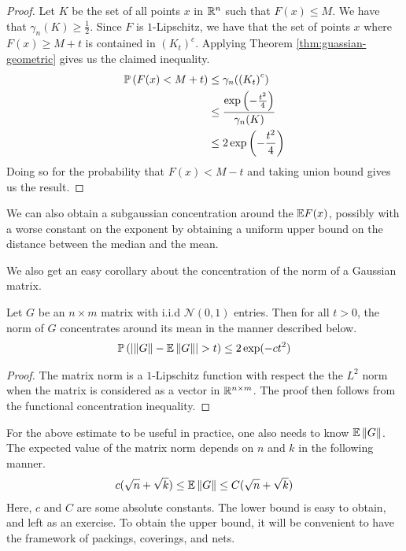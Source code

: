 \documentclass[11pt]{article}
\begin{document}
\begin{proof}
  Let $K$ be the set of all points $x$ in $\R^n$ such that $F(x) \leq M$.
  We have that $\gamma_n(K) \geq \frac{1}{2}$.
  Since $F$ is $1$-Lipschitz, we have that the set of points $x$ where $F(x) \geq M+t$ is contained in $\left( K_t \right)^c$.
  Applying Theorem \ref{thm:guassian-geometric} gives us the claimed inequality.
  \begin{align*}
    \P\left( F(x) < M + t \right) &\leq \gamma_n(\left( K_t \right)^c) \\
                                  &\leq \frac{\exp\left( - \frac{t^2}{4} \right)}{\gamma_n(K)} \\
    &\leq 2 \exp\left( - \frac{t^2}{4} \right)
  \end{align*}
  Doing so for the probability that $F(x) < M - t$ and taking union bound gives us the result.
\end{proof}
\begin{remark}
  We can also obtain a subgaussian concentration around the $\E F(x)$, possibly with a worse constant on the exponent by obtaining a uniform upper bound on the distance between the median and the mean.
\end{remark}

We also get an easy corollary about the concentration of the norm of a Gaussian matrix.
\begin{corollary}
  Let $G$ be an $n \times m$ matrix with i.i.d $\mathcal{N}(0, 1)$ entries.
  Then for all $t > 0$, the norm of $G$ concentrates around its mean in the manner described below.
  \begin{align*}
    \P\left( \left| \norm{G} - \E \norm{G} \right| > t \right) \leq 2 \exp(-ct^2)
  \end{align*}
\end{corollary}
\begin{proof}
  The matrix norm is a $1$-Lipschitz function with respect the the $L^2$ norm when the matrix is considered as a vector in $\R^{n \times m}$.
  The proof then follows from the functional concentration inequality.
\end{proof}

For the above estimate to be useful in practice, one also needs to know $\E\norm{G}$.
The expected value of the matrix norm depends on $n$ and $k$ in the following manner.
\begin{align*}
  c(\sqrt{n} + \sqrt{k}) \leq \E \norm{G} \leq C (\sqrt{n} + \sqrt{k})
\end{align*}
Here, $c$ and $C$ are some absolute constants.
The lower bound is easy to obtain, and left as an exercise.
To obtain the upper bound, it will be convenient to have the framework of packings, coverings, and nets.
\end{document}
